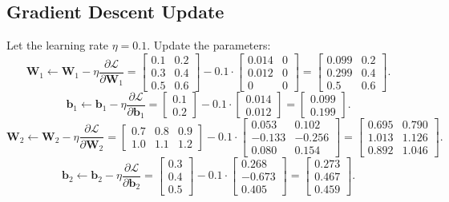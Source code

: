 \begin{notechapter}
\subsection{Gradient Descent Update}
Let the learning rate \(\eta = 0.1\). Update the parameters:
\[
\mathbf{W}_1 \leftarrow \mathbf{W}_1 - \eta \frac{\partial \mathcal{L}}{\partial \mathbf{W}_1} =
\begin{bmatrix}
0.1 & 0.2 \\
0.3 & 0.4 \\
0.5 & 0.6
\end{bmatrix} -
0.1 \cdot
\begin{bmatrix}
0.014 & 0 \\
0.012 & 0 \\
0 & 0
\end{bmatrix} =
\begin{bmatrix}
0.099 & 0.2 \\
0.299 & 0.4 \\
0.5 & 0.6
\end{bmatrix}.
\]
\[
\mathbf{b}_1 \leftarrow \mathbf{b}_1 - \eta \frac{\partial \mathcal{L}}{\partial \mathbf{b}_1} =
\begin{bmatrix}
0.1 \\
0.2
\end{bmatrix} -
0.1 \cdot
\begin{bmatrix}
0.014 \\
0.012
\end{bmatrix} =
\begin{bmatrix}
0.099 \\
0.199
\end{bmatrix}.
\]
\[
\mathbf{W}_2 \leftarrow \mathbf{W}_2 - \eta \frac{\partial \mathcal{L}}{\partial \mathbf{W}_2} =
\begin{bmatrix}
0.7 & 0.8 & 0.9 \\
1.0 & 1.1 & 1.2
\end{bmatrix} -
0.1 \cdot
\begin{bmatrix}
0.053 & 0.102 \\
-0.133 & -0.256 \\
0.080 & 0.154
\end{bmatrix} =
\begin{bmatrix}
0.695 & 0.790 \\
1.013 & 1.126 \\
0.892 & 1.046
\end{bmatrix}.
\]
\[
\mathbf{b}_2 \leftarrow \mathbf{b}_2 - \eta \frac{\partial \mathcal{L}}{\partial \mathbf{b}_2} =
\begin{bmatrix}
0.3 \\
0.4 \\
0.5
\end{bmatrix} -
0.1 \cdot
\begin{bmatrix}
0.268 \\
-0.673 \\
0.405
\end{bmatrix} =
\begin{bmatrix}
0.273 \\
0.467 \\
0.459
\end{bmatrix}.
\]


\end{notechapter}
